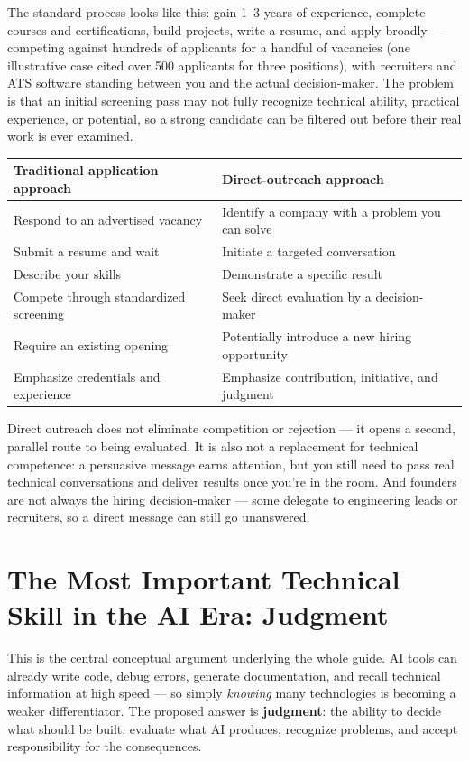The standard process looks like this: gain 1--3 years of experience, complete courses and certifications, build
projects, write a resume, and apply broadly --- competing against hundreds of applicants for a handful of
vacancies (one illustrative case cited over 500 applicants for three positions), with recruiters and ATS software
standing between you and the actual decision-maker. The problem is that an initial screening pass may not fully
recognize technical ability, practical experience, or potential, so a strong candidate can be filtered out before
their real work is ever examined.

\begin{longtable}{p{} p{}}
\toprule
\textbf{Traditional application approach} & \textbf{Direct-outreach approach} \\
\midrule
\endhead
Respond to an advertised vacancy & Identify a company with a problem you can solve \\
Submit a resume and wait & Initiate a targeted conversation \\
Describe your skills & Demonstrate a specific result \\
Compete through standardized screening & Seek direct evaluation by a decision-maker \\
Require an existing opening & Potentially introduce a new hiring opportunity \\
Emphasize credentials and experience & Emphasize contribution, initiative, and judgment \\
\bottomrule
\end{longtable}

\begin{caution}
Direct outreach does not eliminate competition or rejection --- it opens a second, parallel route to being
evaluated. It is also not a replacement for technical competence: a persuasive message earns attention, but you
still need to pass real technical conversations and deliver results once you're in the room. And founders are not
always the hiring decision-maker --- some delegate to engineering leads or recruiters, so a direct message can
still go unanswered.
\end{caution}

\section{The Most Important Technical Skill in the AI Era: Judgment}

This is the central conceptual argument underlying the whole guide. AI tools can already write code, debug
errors, generate documentation, and recall technical information at high speed --- so simply \emph{knowing} many
technologies is becoming a weaker differentiator. The proposed answer is \textbf{judgment}: the ability to decide
what should be built, evaluate what AI produces, recognize problems, and accept responsibility for the
consequences.


